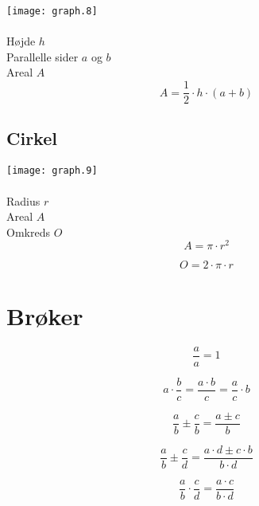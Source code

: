 \documentclass[11pt,a5paper,fleqn,leqno]{book}
\begin{document}
\texttt{[image: graph.8]}
\\
\\
Højde $h$ \\
Parallelle sider $a$ og $b$ \\
Areal $A$
\begin{equation}
A = \frac{1}{2} \cdot h \cdot (a + b)
\end{equation}

\subsection{Cirkel}

\texttt{[image: graph.9]}
\\
\\
Radius $r$ \\
Areal $A$ \\
Omkreds $O$
\begin{equation} \label{eq:areal_cirkel}
A = \pi \cdot r^2
\end{equation}

\begin{equation} \label{eq:omkreds_cirkel}
O = 2 \cdot \pi \cdot r
\end{equation}

\section{Brøker}

\begin{equation} \label{eq:taeller_naevner_det_samme}
\frac{a}{a} = 1
\end{equation}

\begin{equation} \label{eq:konstant_gange_med_broek}
a \cdot \frac{b}{c} = \frac{a \cdot b}{c} = \frac{a}{c} \cdot b
\end{equation}

\begin{equation} \label{eq:broeker_med_ens_naevnere_plusminus}
\frac{a}{b} \pm \frac{c}{b} = \frac{a \pm c}{b}
\end{equation}

\begin{equation} \label{eq:broeker_med_forskellige_naevnere_plusminus}
\frac{a}{b} \pm \frac{c}{d} = \frac{a \cdot d \pm c \cdot b}{b \cdot d}
\end{equation}

\begin{equation} \label{eq:broeker_ganget_sammen}
\frac{a}{b} \cdot \frac{c}{d} = \frac{a \cdot c}{b \cdot d}
\end{equation}
\end{document}
